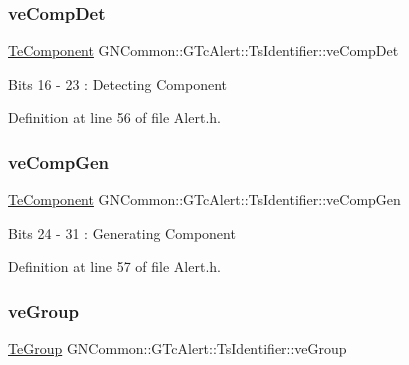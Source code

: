 \subsubsection{\texorpdfstring{ve\+Comp\+Det}{veCompDet}}
{\footnotesize\ttfamily \mbox{\hyperlink{class_g_n_common_1_1_g_tc_alert_aec0a7908321c01ae225df4908d7f3fa0}{Te\+Component}} G\+N\+Common\+::\+G\+Tc\+Alert\+::\+Ts\+Identifier\+::ve\+Comp\+Det}

Bits 16 -\/ 23 \+: Detecting Component 

Definition at line 56 of file Alert.\+h.

\mbox{\label{struct_g_n_common_1_1_g_tc_alert_1_1_ts_identifier_a410931b980bb13ee9eeece7f69c576b1}} 
\subsubsection{\texorpdfstring{ve\+Comp\+Gen}{veCompGen}}
{\footnotesize\ttfamily \mbox{\hyperlink{class_g_n_common_1_1_g_tc_alert_aec0a7908321c01ae225df4908d7f3fa0}{Te\+Component}} G\+N\+Common\+::\+G\+Tc\+Alert\+::\+Ts\+Identifier\+::ve\+Comp\+Gen}

Bits 24 -\/ 31 \+: Generating Component 

Definition at line 57 of file Alert.\+h.

\mbox{\label{struct_g_n_common_1_1_g_tc_alert_1_1_ts_identifier_af23bb4b61df8abb45a4a77162a91e980}} 
\subsubsection{\texorpdfstring{ve\+Group}{veGroup}}
{\footnotesize\ttfamily \mbox{\hyperlink{class_g_n_common_1_1_g_tc_alert_a2deb7f82fcf5d88b4e10d74fa6c28cb7}{Te\+Group}} G\+N\+Common\+::\+G\+Tc\+Alert\+::\+Ts\+Identifier\+::ve\+Group}

